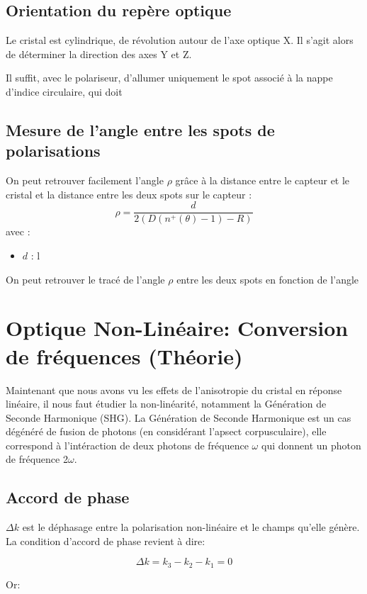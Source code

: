 \documentclass[a4paper,11pt]{report}
\begin{document}
\section{Orientation du repère optique}
Le cristal est cylindrique, de révolution autour de l'axe optique X. Il s'agit alors de déterminer la direction des axes Y et Z.

Il suffit, avec le polariseur, d'allumer uniquement le spot associé à la nappe d'indice circulaire, qui doit 

\section{Mesure de l'angle entre les spots de polarisations}
On peut retrouver facilement l'angle $\rho$ grâce à la distance entre le capteur et le cristal et la distance entre les deux spots sur le capteur : 
\[  \rho = \frac{d}{2(D(n^+(\theta)-1)-R)} \]
avec :
\begin{itemize}
    \item $d$ : l
\end{itemize}
On peut retrouver le tracé de l'angle $\rho$ entre les deux spots en fonction de l'angle


\chapter{Optique Non-Linéaire: Conversion de fréquences (Théorie)}\label{ONLTheorie}

Maintenant que nous avons vu les effets de l'anisotropie du cristal en réponse linéaire, il nous faut étudier la non-linéarité, notamment la Génération de Seconde Harmonique (SHG). La Génération de Seconde Harmonique est un cas dégénéré de fusion de photons (en considérant l'apsect corpusculaire), elle correspond à l'intéraction de deux photons de fréquence $\omega$ qui donnent un photon de fréquence 2$\omega$.

\section{Accord de phase}


$\Delta k$ est le déphasage entre la polarisation non-linéaire et le champs qu'elle génère. La condition d'accord de phase revient à dire:

\[\Delta k=k_3-k_2-k_1=0\]

Or:
\end{document}

